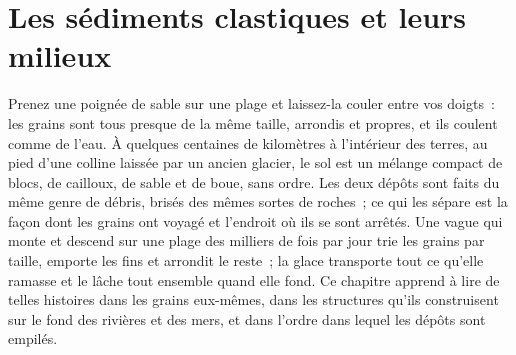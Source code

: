 \chapter{Les sédiments clastiques et leurs milieux}\label{ch:b1:clastic-sediments}

Prenez une poignée de sable sur une plage et laissez-la couler entre vos doigts~: les
grains sont tous presque de la même taille, arrondis et propres, et ils coulent comme
de l'eau. À quelques centaines de kilomètres à l'intérieur des terres, au pied d'une colline laissée par un ancien
glacier, le sol est un mélange compact de blocs, de cailloux, de sable et de boue,
sans ordre. Les deux dépôts sont faits du même genre de débris, brisés
des mêmes sortes de roches~; ce qui les sépare est la façon dont les grains ont voyagé et
l'endroit où ils se sont arrêtés. Une vague qui monte et descend sur une plage des milliers de
fois par jour trie les grains par taille, emporte les fins et arrondit
le reste~; la glace transporte tout ce qu'elle ramasse et le lâche tout ensemble quand elle
fond. Ce chapitre apprend à lire de telles histoires dans les grains eux-mêmes,
dans les structures qu'ils construisent sur le fond des rivières et des mers, et dans
l'ordre dans lequel les dépôts sont empilés.

